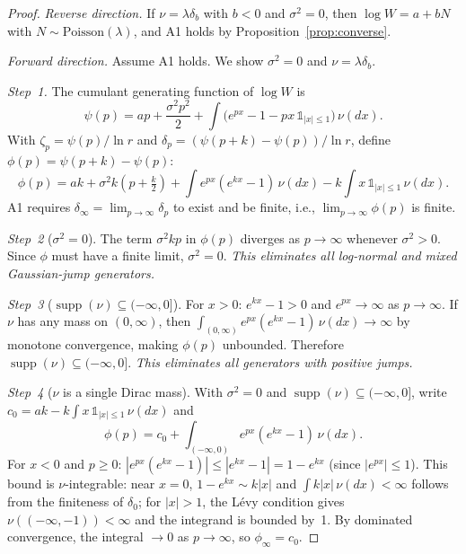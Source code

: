 \documentclass[12pt]{amsart}
\theoremstyle{definition}
\theoremstyle{remark}
\DeclareMathOperator{\supp}{supp}
\begin{document}
\begin{proof}
\textit{Reverse direction.} If $\nu = \lambda\delta_b$ with $b < 0$
and $\sigma^2 = 0$, then $\log W = a + bN$ with $N \sim
\mathrm{Poisson}(\lambda)$, and A1 holds by
Proposition~\ref{prop:converse}.

\textit{Forward direction.}  Assume A1 holds.  We show $\sigma^2 = 0$
and $\nu = \lambda\delta_b$.

\textit{Step~1.}  The cumulant generating function of $\log W$ is
\[
  \psi(p) = ap + \frac{\sigma^2 p^2}{2}
  + \int\bigl(e^{px} - 1 - px\,\mathds{1}_{|x|\leq 1}\bigr)
  \,\nu(dx).
\]
With $\zeta_p = \psi(p)/\ln r$ and $\delta_p = (\psi(p+k) -
\psi(p))/\ln r$, define $\phi(p) = \psi(p+k) - \psi(p)$:
\[
  \phi(p) = ak + \sigma^2 k\!\left(p + \tfrac{k}{2}\right)
  + \int e^{px}(e^{kx}-1)\,\nu(dx)
  - k\!\int x\,\mathds{1}_{|x|\leq 1}\,\nu(dx).
\]
A1 requires $\delta_\infty = \lim_{p\to\infty}\delta_p$ to exist and
be finite, i.e., $\lim_{p\to\infty}\phi(p)$ is finite.

\textit{Step~2} ($\sigma^2 = 0$).  The term $\sigma^2 kp$ in
$\phi(p)$ diverges as $p \to \infty$ whenever $\sigma^2 > 0$.  Since
$\phi$ must have a finite limit, $\sigma^2 = 0$.  \textit{This
eliminates all log-normal and mixed Gaussian-jump generators.}

\textit{Step~3} ($\supp(\nu) \subseteq (-\infty,0]$).  For $x > 0$:
$e^{kx} - 1 > 0$ and $e^{px} \to \infty$ as $p \to \infty$.  If
$\nu$ has any mass on $(0,\infty)$, then $\int_{(0,\infty)}
e^{px}(e^{kx}-1)\,\nu(dx) \to \infty$ by monotone convergence,
making $\phi(p)$ unbounded.  Therefore $\supp(\nu) \subseteq
(-\infty,0]$.  \textit{This eliminates all generators with positive
jumps.}

\textit{Step~4} ($\nu$ is a single Dirac mass).  With $\sigma^2 = 0$
and $\supp(\nu) \subseteq (-\infty,0]$, write $c_0 = ak - k\int
x\,\mathds{1}_{|x|\leq 1}\,\nu(dx)$ and
\[
  \phi(p) = c_0 + \int_{(-\infty,0)} e^{px}(e^{kx}-1)\,\nu(dx).
\]
For $x < 0$ and $p \geq 0$: $|e^{px}(e^{kx}-1)| \leq |e^{kx}-1| = 1
- e^{kx}$ (since $|e^{px}| \leq 1$).  This bound is
$\nu$-integrable: near $x = 0$, $1 - e^{kx} \sim k|x|$ and $\int
k|x|\,\nu(dx) < \infty$ follows from the finiteness of $\delta_0$;
for $|x| > 1$, the L\'evy condition gives $\nu((-\infty,-1)) <
\infty$ and the integrand is bounded by~1.  By dominated convergence,
the integral $\to 0$ as $p \to \infty$, so $\phi_\infty = c_0$.


\end{proof}
\end{document}
